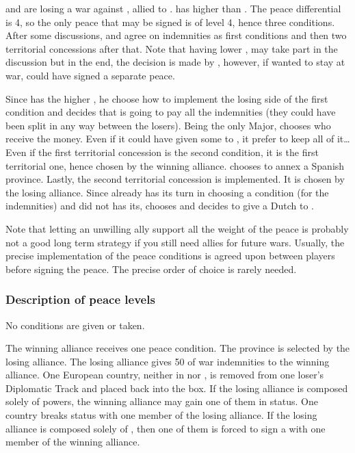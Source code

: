 \begin{exemple}[Disagreement]
  \HIS and \HOL are losing a war against \FRA, allied to \paysPortugal. \HOL
  has higher \DIP than \HIS. The peace differential is 4, so the only peace
  that may be signed is of level 4, hence three conditions. After some
  discussions, \FRA and \HOL agree on indemnities as first conditions and then
  two territorial concessions after that. Note that having lower \DIP, \HIS
  may take part in the discussion but in the end, the decision is made by
  \HOL, however, if \HOL wanted to stay at war, \HIS could have signed a
  separate peace.

  Since \HOL has the higher \DIP, he choose how to implement the losing side
  of the first condition and decides that \HIS is going to pay all the
  indemnities (they could have been split in any way between the
  losers). Being the only Major, \FRA chooses who receive the money. Even if
  it could have given some to \paysPortugal, it prefer to keep all of it\ldots
  Even if the first territorial concession is the second condition, it is the
  first territorial one, hence chosen by the winning alliance. \FRA chooses to
  annex a Spanish province. Lastly, the second territorial concession is
  implemented. It is chosen by the losing alliance. Since \HOL already has its
  turn in choosing a condition (for the indemnities) and \HIS did not has its,
  \HIS chooses and decides to give a Dutch \COL to \paysPortugal.

  Note that letting an unwilling ally support all the weight of the peace is
  probably not a good long term strategy if you still need allies for future
  wars. Usually, the precise implementation of the peace conditions is agreed
  upon between players before signing the peace. The precise order of choice
  is rarely needed.
\end{exemple}

\subsubsection{Description of peace levels}
 No conditions are given or taken.

 The winning alliance receives one peace condition.
 The province is selected by the losing
alliance.
\bparag[Indemnities] The losing alliance gives 50 \ducats of war indemnities
to the winning alliance.
 One European country, neither in
\VASSAL nor \ANNEXION, is removed from one loser's Diplomatic Track and placed
back into the \Neutral box. If the losing alliance is composed solely of \MIN
powers, the winning alliance may gain one of them in \MR status.
 One \ROTW country breaks \dipFR status with
one member of the losing alliance. If the losing alliance is composed solely
of \MIN, then one of them is forced to sign a \dipFR with one member of the
winning alliance.

